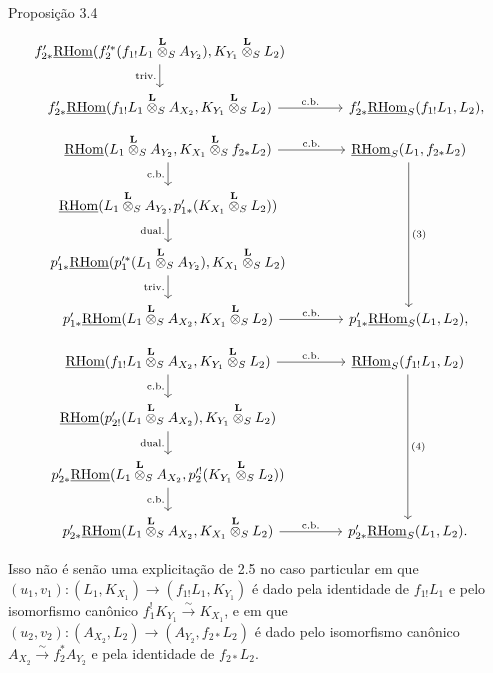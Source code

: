 \begin{statement}{Proposição 3.4}
\[\begin{tikzcd}[column sep=3.7em,row sep=1.7em]
f'_{2*}\uRHom(f_2'^*(f_{1!}L_1\overset{\mathbf L}{\otimes}_S A_{Y_2}),K_{Y_1}\overset{\mathbf L}{\otimes}_S L_2) \arrow[d,"\mathrm{triv.}"']
& \\
f'_{2*}\uRHom(f_{1!}L_1\overset{\mathbf L}{\otimes}_S A_{X_2},K_{Y_1}\overset{\mathbf L}{\otimes}_S L_2) \arrow[r,"\mathrm{c.b.}"]
& f'_{2*}\uRHom_S(f_{1!}L_1,L_2),
\end{tikzcd}
\]
\[
\begin{tikzcd}[column sep=3.7em,row sep=1.7em]
\uRHom(L_1\overset{\mathbf L}{\otimes}_S A_{Y_2},K_{X_1}\overset{\mathbf L}{\otimes}_S f_{2*}L_2)
  \arrow[r,"\mathrm{c.b.}"] \arrow[d,"\mathrm{c.b.}"']
& \uRHom_S(L_1,f_{2*}L_2) \arrow[ddd,"(3)"] \\
\uRHom(L_1\overset{\mathbf L}{\otimes}_S A_{Y_2},p'_{1*}(K_{X_1}\overset{\mathbf L}{\otimes}_S L_2)) \arrow[d,"\mathrm{dual.}"']
& \\
p'_{1*}\uRHom(p_1'^*(L_1\overset{\mathbf L}{\otimes}_S A_{Y_2}),K_{X_1}\overset{\mathbf L}{\otimes}_S L_2) \arrow[d,"\mathrm{triv.}"']
& \\
p'_{1*}\uRHom(L_1\overset{\mathbf L}{\otimes}_S A_{X_2},K_{X_1}\overset{\mathbf L}{\otimes}_S L_2) \arrow[r,"\mathrm{c.b.}"]
& p'_{1*}\uRHom_S(L_1,L_2),
\end{tikzcd}
\]
\[
\begin{tikzcd}[column sep=3.7em,row sep=1.7em]
\uRHom(f_{1!}L_1\overset{\mathbf L}{\otimes}_S A_{X_2},K_{Y_1}\overset{\mathbf L}{\otimes}_S L_2)
  \arrow[r,"\mathrm{c.b.}"] \arrow[d,"\mathrm{c.b.}"']
& \uRHom_S(f_{1!}L_1,L_2) \arrow[ddd,"(4)"] \\
\uRHom(p'_{2!}(L_1\overset{\mathbf L}{\otimes}_S A_{X_2}),K_{Y_1}\overset{\mathbf L}{\otimes}_S L_2) \arrow[d,"\mathrm{dual.}"']
& \\
p'_{2*}\uRHom(L_1\overset{\mathbf L}{\otimes}_S A_{X_2},p_2'^!(K_{Y_1}\overset{\mathbf L}{\otimes}_S L_2)) \arrow[d,"\mathrm{c.b.}"']
& \\
p'_{2*}\uRHom(L_1\overset{\mathbf L}{\otimes}_S A_{X_2},K_{X_1}\overset{\mathbf L}{\otimes}_S L_2) \arrow[r,"\mathrm{c.b.}"]
& p'_{2*}\uRHom_S(L_1,L_2).
\end{tikzcd}
\]
\end{statement}
Isso não é senão uma explicitação de 2.5 no caso particular em que $(u_1,v_1):(L_1,K_{X_1})\to(f_{1!}L_1,K_{Y_1})$ é dado pela identidade de $f_{1!}L_1$ e pelo isomorfismo canônico $f_1^!K_{Y_1}\xrightarrow{\sim}K_{X_1}$, e em que $(u_2,v_2):(A_{X_2},L_2)\to(A_{Y_2},f_{2*}L_2)$ é dado pelo isomorfismo canônico $A_{X_2}\xrightarrow{\sim}f_2^*A_{Y_2}$ e pela identidade de $f_{2*}L_2$.

